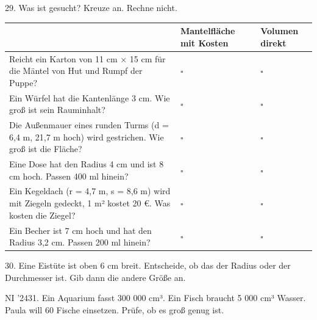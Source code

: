 \documentclass[11pt]{article}
\begin{document}
\par\Needspace*{0.55\textheight}
\begin{pfaufg}{}{29.}{}
Was ist gesucht? Kreuze an. Rechne nicht.
\par\smallskip\noindent \begingroup\renewcommand{\arraystretch}{1.4}\begin{tabular}{|>{\raggedright\arraybackslash}p{8.3cm}|>{\centering\arraybackslash\hyphenpenalty=0}p{1.55cm}|>{\centering\arraybackslash\hyphenpenalty=0}p{1.55cm}|}\hline  & {\scriptsize\hspace{0pt}Mantelfläche mit Kosten} & {\scriptsize\hspace{0pt}Volumen direkt} \\ \hline Reicht ein Karton von 11 cm × 15 cm für die Mäntel von Hut und Rumpf der Puppe? & $\square$ & $\square$ \\ \hline Ein Würfel hat die Kantenlänge 3 cm. Wie groß ist sein Rauminhalt? & $\square$ & $\square$ \\ \hline Die Außenmauer eines runden Turms (d = 6,4 m, 21,7 m hoch) wird gestrichen. Wie groß ist die Fläche? & $\square$ & $\square$ \\ \hline Eine Dose hat den Radius 4 cm und ist 8 cm hoch. Passen 400 ml hinein? & $\square$ & $\square$ \\ \hline Ein Kegeldach (r = 4,7 m, s = 8,6 m) wird mit Ziegeln gedeckt, 1 m² kostet 20 €. Was kosten die Ziegel? & $\square$ & $\square$ \\ \hline Ein Becher ist 7 cm hoch und hat den Radius 3,2 cm. Passen 200 ml hinein? & $\square$ & $\square$ \\ \hline\end{tabular}\endgroup\par
\end{pfaufg}
\pfgruppe{}
\begin{pfaufg}{}{30.}{}
Eine Eistüte ist oben $6$ cm breit. Entscheide, ob das der Radius oder der Durchmesser ist. Gib dann die andere Größe an.
\par\noindent \leerfeld \par
{}
\end{pfaufg}
\pfgruppe{}
\begin{pfaufg}{NI ’24}{31.}{}
Ein Aquarium fasst 300 000 cm³. Ein Fisch braucht 5 000 cm³ Wasser. Paula will 60 Fische einsetzen. Prüfe, ob es groß genug ist.
\end{pfaufg}
\end{document}
